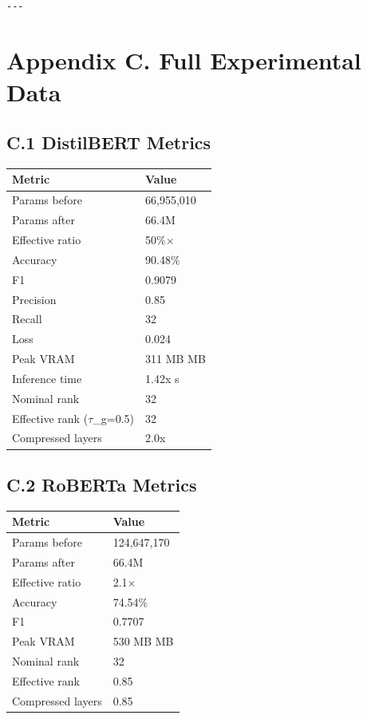 \begin{lstlisting}

---
\end{lstlisting}


\section{Appendix C. Full Experimental Data}

\subsection{C.1 DistilBERT Metrics}

\begin{table}[H]
\centering
\small
\begin{tabular}{ll}
\toprule
\textbf{Metric} & \textbf{Value} \\
\midrule
Params before & 66,955,010 \\
Params after & 66.4M \\
Effective ratio & 50\%$\times$ \\
Accuracy & 90.48\% \\
F1 & 0.9079 \\
Precision & 0.85 \\
Recall & 32 \\
Loss & 0.024 \\
Peak VRAM & 311 MB MB \\
Inference time & 1.42x s \\
Nominal rank & 32 \\
Effective rank ($\tau$\_g=0.5) & 32 \\
Compressed layers & 2.0x \\
\bottomrule
\end{tabular}
\end{table}

\subsection{C.2 RoBERTa Metrics}

\begin{table}[H]
\centering
\small
\begin{tabular}{ll}
\toprule
\textbf{Metric} & \textbf{Value} \\
\midrule
Params before & 124,647,170 \\
Params after & 66.4M \\
Effective ratio & 2.1$\times$ \\
Accuracy & 74.54\% \\
F1 & 0.7707 \\
Peak VRAM & 530 MB MB \\
Nominal rank & 32 \\
Effective rank & 0.85 \\
Compressed layers & 0.85 \\
\bottomrule
\end{tabular}
\end{table}

